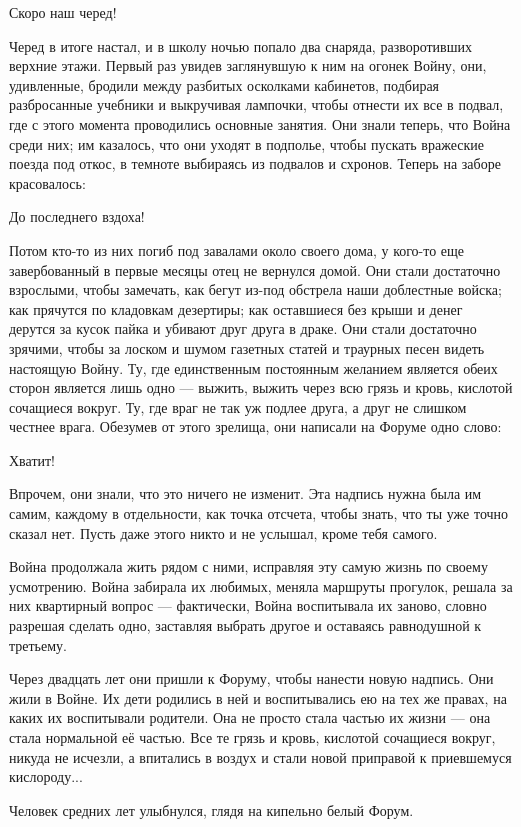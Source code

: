 \documentclass[a5paper]{article}
\begin{document}
Скоро наш черед!

Черед в итоге настал, и в школу ночью попало два снаряда, разворотивших верхние этажи. Первый раз увидев заглянувшую к ним на огонек Войну, они, удивленные, бродили между разбитых осколками кабинетов, подбирая разбросанные учебники и выкручивая лампочки, чтобы отнести их все в подвал, где с этого момента проводились основные занятия. Они знали теперь, что Война среди них; им казалось, что они уходят в подполье, чтобы пускать вражеские поезда под откос, в темноте выбираясь из подвалов и схронов. Теперь на заборе красовалось:

До последнего вздоха!

Потом кто-то из них погиб под завалами около своего дома, у кого-то еще завербованный в первые месяцы отец не вернулся домой. Они стали достаточно взрослыми, чтобы замечать, как бегут из-под обстрела наши доблестные войска; как прячутся по кладовкам дезертиры; как оставшиеся без крыши и денег дерутся за кусок пайка и убивают друг друга в драке. Они стали достаточно зрячими, чтобы за лоском и шумом газетных статей и траурных песен видеть настоящую Войну. Ту, где единственным постоянным желанием является обеих сторон является лишь одно --- выжить, выжить через всю грязь и кровь, кислотой сочащиеся вокруг. Ту, где враг не так уж подлее друга, а друг не слишком честнее врага. Обезумев от этого зрелища, они написали на Форуме одно слово:

Хватит!

Впрочем, они знали, что это ничего не изменит. Эта надпись нужна была им самим, каждому в отдельности, как точка отсчета, чтобы знать, что ты уже точно сказал нет. Пусть даже этого никто и не услышал, кроме тебя самого.

Война продолжала жить рядом с ними, исправляя эту самую жизнь по своему усмотрению. Война забирала их любимых, меняла маршруты прогулок, решала за них квартирный вопрос --- фактически, Война воспитывала их заново, словно разрешая сделать одно, заставляя выбрать другое и оставаясь равнодушной к третьему.

Через двадцать лет они пришли к Форуму, чтобы нанести новую надпись. Они жили в Войне. Их дети родились в ней и воспитывались ею на тех же правах, на каких их воспитывали родители. Она не просто стала частью их жизни --- она стала нормальной её частью. Все те грязь и кровь, кислотой сочащиеся вокруг, никуда не исчезли, а впитались в воздух и стали новой приправой к приевшемуся кислороду...

Человек средних лет улыбнулся, глядя на кипельно белый Форум.
\end{document}
